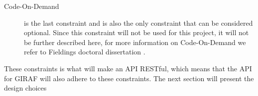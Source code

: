 \begin{description}
\begin{itemize}
    \end{itemize}
    \item [Code-On-Demand] is the last constraint and is also the only constraint that can be considered optional.
    Since this constraint will not be used for this project, it will not be further described here, for more information on Code-On-Demand we refer to Fieldings doctoral dissertation \citep{fielding2000rest}.
\end{description}

These constraints is what will make an API RESTful, which means that the API for GIRAF will also adhere to these constraints.
The next section will present the design choices
